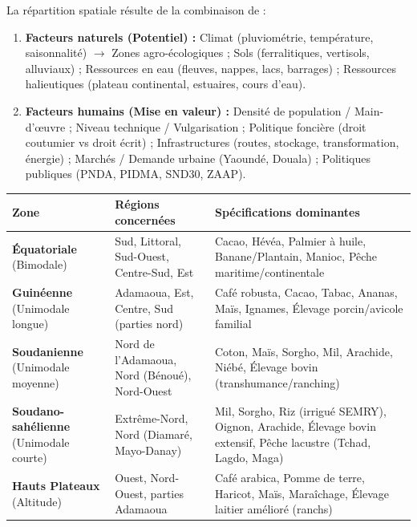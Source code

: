 \documentclass[11pt]{article}
\begin{document}
\begin{propriete}
La répartition spatiale résulte de la combinaison de :
\begin{enumerate}
    \item \textbf{Facteurs naturels (Potentiel) :} Climat (pluviométrie, température, saisonnalité) $\to$ Zones agro-écologiques ; Sols (ferralitiques, vertisols, alluviaux) ; Ressources en eau (fleuves, nappes, lacs, barrages) ; Ressources halieutiques (plateau continental, estuaires, cours d'eau).
    \item \textbf{Facteurs humains (Mise en valeur) :} Densité de population / Main-d'œuvre ; Niveau technique / Vulgarisation ; Politique foncière (droit coutumier vs droit écrit) ; Infrastructures (routes, stockage, transformation, énergie) ; Marchés / Demande urbaine (Yaoundé, Douala) ; Politiques publiques (PNDA, PIDMA, SND30, ZAAP).
\end{enumerate}
\end{propriete}

\begin{exemplebox}
\begin{center}
\begin{tabularx}{\linewidth}{|l|X|X|}\hline
\rowcolor{popblueL} \textbf{Zone} & \textbf{Régions concernées} & \textbf{Spécifications dominantes} \\ \hline
\textbf{Équatoriale} (Bimodale) & Sud, Littoral, Sud-Ouest, Centre-Sud, Est & Cacao, Hévéa, Palmier à huile, Banane/Plantain, Manioc, Pêche maritime/continentale \\ \hline
\textbf{Guinéenne} (Unimodale longue) & Adamaoua, Est, Centre, Sud (parties nord) & Café robusta, Cacao, Tabac, Ananas, Maïs, Ignames, Élevage porcin/avicole familial \\ \hline
\textbf{Soudanienne} (Unimodale moyenne) & Nord de l'Adamaoua, Nord (Bénoué), Nord-Ouest & Coton, Maïs, Sorgho, Mil, Arachide, Niébé, Élevage bovin (transhumance/ranching) \\ \hline
\textbf{Soudano-sahélienne} (Unimodale courte) & Extrême-Nord, Nord (Diamaré, Mayo-Danay) & Mil, Sorgho, Riz (irrigué SEMRY), Oignon, Arachide, Élevage bovin extensif, Pêche lacustre (Tchad, Lagdo, Maga) \\ \hline
\textbf{Hauts Plateaux} (Altitude) & Ouest, Nord-Ouest, parties Adamaoua & Café arabica, Pomme de terre, Haricot, Maïs, Maraîchage, Élevage laitier amélioré (ranchs) \\ \hline
\end{tabularx}
\end{center}
\end{exemplebox}
\end{document}
